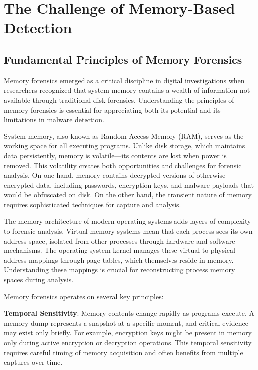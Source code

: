 \section{The Challenge of Memory-Based Detection}
\label{sec:memory_challenge}

\subsection{Fundamental Principles of Memory Forensics}
\label{subsec:memory_forensics_principles}

Memory forensics emerged as a critical discipline in digital investigations when researchers recognized that system memory contains a wealth of information not available through traditional disk forensics. Understanding the principles of memory forensics is essential for appreciating both its potential and its limitations in malware detection.

System memory, also known as Random Access Memory (RAM), serves as the working space for all executing programs. Unlike disk storage, which maintains data persistently, memory is volatile—its contents are lost when power is removed. This volatility creates both opportunities and challenges for forensic analysis. On one hand, memory contains decrypted versions of otherwise encrypted data, including passwords, encryption keys, and malware payloads that would be obfuscated on disk. On the other hand, the transient nature of memory requires sophisticated techniques for capture and analysis.

The memory architecture of modern operating systems adds layers of complexity to forensic analysis. Virtual memory systems mean that each process sees its own address space, isolated from other processes through hardware and software mechanisms. The operating system kernel manages these virtual-to-physical address mappings through page tables, which themselves reside in memory. Understanding these mappings is crucial for reconstructing process memory spaces during analysis.

Memory forensics operates on several key principles:

\textbf{Temporal Sensitivity}: Memory contents change rapidly as programs execute. A memory dump represents a snapshot at a specific moment, and critical evidence may exist only briefly. For example, encryption keys might be present in memory only during active encryption or decryption operations. This temporal sensitivity requires careful timing of memory acquisition and often benefits from multiple captures over time.

